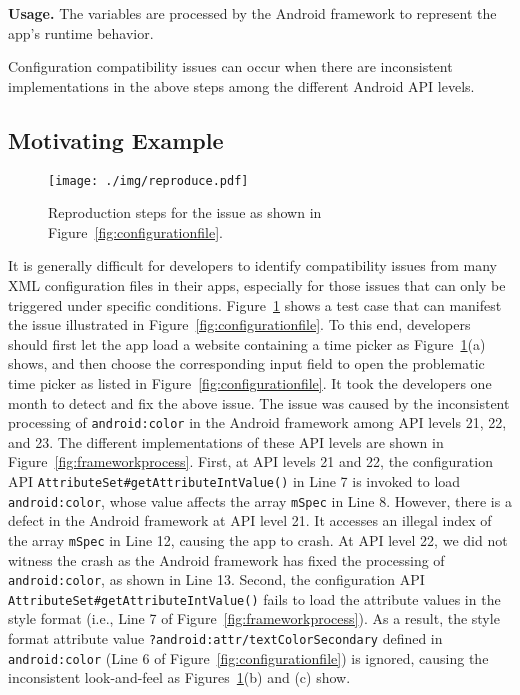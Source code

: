 \textbf{Usage.} The variables are processed by the Android framework to represent the app's runtime behavior.

Configuration compatibility issues can occur when there are inconsistent implementations in the above steps
 among the different Android API levels.

\subsection{Motivating Example}
\label{sec:motivating_example}
\begin{figure}[t]
	\centering
	\texttt{[image: ./img/reproduce.pdf]}
	\caption{{Reproduction steps for the issue as shown in Figure~\ref{fig:configurationfile}.}}
	\label{fig:reproduce}
\end{figure}
It is generally difficult for developers to identify compatibility issues from many XML configuration files in their apps, especially for those issues that can only be triggered under specific conditions.
Figure~\ref{fig:reproduce} shows a test case that can manifest the issue illustrated in Figure~\ref{fig:configurationfile}.
To this end, developers should first let the app load a website containing a time picker as Figure~\ref{fig:reproduce}(a) shows, and then choose the corresponding input field to open the problematic time picker as listed in Figure~\ref{fig:configurationfile}.
It took the developers one month to detect and fix the above issue.
The issue was caused by the inconsistent processing of \texttt{android:color} in the Android framework among API levels 21, 22, and 23.
The different implementations of these API levels are shown in Figure~\ref{fig:frameworkprocess}. First, at API levels 21 and 22, the configuration API \texttt{AttributeSet\#getAttributeIntValue()} in Line 7 is invoked to load \texttt{android:color}, whose value affects the array \texttt{mSpec} in Line 8. However, there is a defect in the Android framework at API level 21. It accesses an illegal index of the array \texttt{mSpec} in Line 12, causing the app to crash. At API level 22, we did not witness the crash as the Android framework has fixed the processing of \texttt{android:color}, as shown in Line 13. 
Second, %
the configuration API \texttt{AttributeSet\#getAttributeIntValue()} fails to load the attribute values in the style format (i.e., Line 7 of Figure~\ref{fig:frameworkprocess}). 
As a result, the style format attribute value \texttt{?android:attr/textColorSecondary} defined in \texttt{android:color} (Line 6 of Figure~\ref{fig:configurationfile}) is ignored, causing the inconsistent look-and-feel as Figures~\ref{fig:reproduce}(b) and (c) show.

